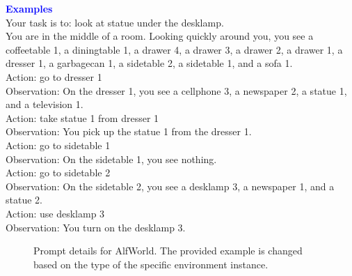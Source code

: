 \begin{tcolorbox}[breakable,title=Prompt Details for AlfWorld ]
\textbf{\textcolor{blue}{Examples}}\\
      Your task is to: look at statue under the desklamp. \\
      You are in the middle of a room. Looking quickly around you, you see a coffeetable 1, a diningtable 1, a drawer 4, a drawer 3, a drawer 2, a drawer 1, a dresser 1, a garbagecan 1, a sidetable 2, a sidetable 1, and a sofa 1. \\
      Action: go to dresser 1 \\
      Observation: On the dresser 1, you see a cellphone 3, a newspaper 2, a statue 1, and a television 1. \\
      Action: take statue 1 from dresser 1 \\
      Observation: You pick up the statue 1 from the dresser 1. \\
      Action: go to sidetable 1 \\
      Observation: On the sidetable 1, you see nothing. \\
      Action: go to sidetable 2 \\
      Observation: On the sidetable 2, you see a desklamp 3, a newspaper 1, and a statue 2. \\
      Action: use desklamp 3 \\
      Observation: You turn on the desklamp 3.

\end{tcolorbox}
\begin{figure}[!h]
    \vspace{0.01cm}
    \caption{Prompt details for AlfWorld. The provided example is changed based on the type of the specific environment instance.}
    \label{fig:alfworld_prompt}
\end{figure}